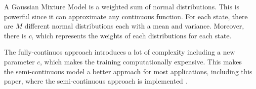 A Gaussian Mixture Model is a weighted sum of normal distributions. This is powerful since it can approximate any continuous function. For each state, there are $M$ different normal distributions each with a mean and variance. Moreover, there is $c$, which represents the weights of each distributions for each state. 

The fully-continuos approach introduces a lot of complexity including a new parameter $c$, which makes the training computationally expensive. This makes the semi-continuous model a better approach for most applications, including this paper, where the semi-continuous approach is implemented \parencite{huang2001spoken}.
